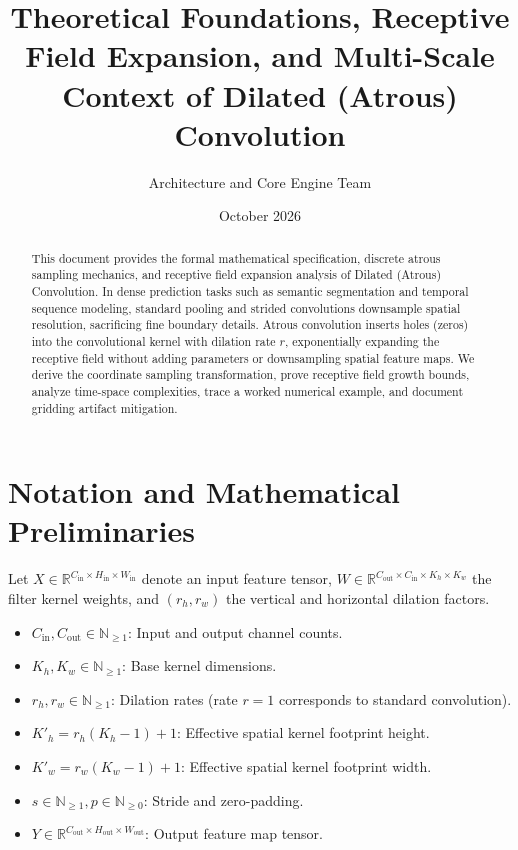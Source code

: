 \documentclass[11pt,a4paper]{article}
\title{\textbf{Theoretical Foundations, Receptive Field Expansion, and Multi-Scale Context of Dilated (Atrous) Convolution}}
\author{Architecture and Core Engine Team}
\date{October 2026}
\theoremstyle{definition}
\begin{document}
\maketitle

\begin{abstract}
This document provides the formal mathematical specification, discrete atrous sampling mechanics, and receptive field expansion analysis of Dilated (Atrous) Convolution. In dense prediction tasks such as semantic segmentation and temporal sequence modeling, standard pooling and strided convolutions downsample spatial resolution, sacrificing fine boundary details. Atrous convolution inserts holes (zeros) into the convolutional kernel with dilation rate $r$, exponentially expanding the receptive field without adding parameters or downsampling spatial feature maps. We derive the coordinate sampling transformation, prove receptive field growth bounds, analyze time-space complexities, trace a worked numerical example, and document gridding artifact mitigation.
\end{abstract}

\section{Notation and Mathematical Preliminaries}

Let $X \in \mathbb{R}^{C_{\text{in}} \times H_{\text{in}} \times W_{\text{in}}}$ denote an input feature tensor, $W \in \mathbb{R}^{C_{\text{out}} \times C_{\text{in}} \times K_h \times K_w}$ the filter kernel weights, and $(r_h, r_w)$ the vertical and horizontal dilation factors.

\begin{itemize}
    \item $C_{\text{in}}, C_{\text{out}} \in \mathbb{N}_{\ge 1}$: Input and output channel counts.
    \item $K_h, K_w \in \mathbb{N}_{\ge 1}$: Base kernel dimensions.
    \item $r_h, r_w \in \mathbb{N}_{\ge 1}$: Dilation rates (rate $r=1$ corresponds to standard convolution).
    \item $K'_h = r_h(K_h - 1) + 1$: Effective spatial kernel footprint height.
    \item $K'_w = r_w(K_w - 1) + 1$: Effective spatial kernel footprint width.
    \item $s \in \mathbb{N}_{\ge 1}, p \in \mathbb{N}_{\ge 0}$: Stride and zero-padding.
    \item $Y \in \mathbb{R}^{C_{\text{out}} \times H_{\text{out}} \times W_{\text{out}}}$: Output feature map tensor.
\end{itemize}
\end{document}
